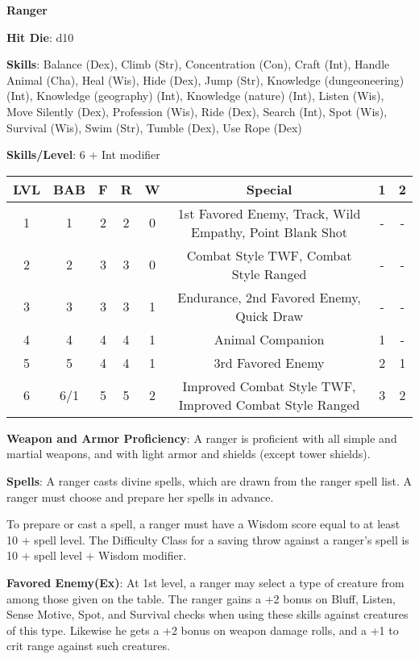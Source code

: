 \textbf{\huge{Ranger}}

\textbf{Hit Die}: d10

\textbf{Skills}: Balance (Dex), Climb (Str), Concentration (Con), Craft (Int), Handle Animal (Cha), Heal (Wis), Hide (Dex), Jump (Str), Knowledge (dungeoneering) (Int), Knowledge (geography) (Int), Knowledge (nature) (Int), Listen (Wis), Move Silently (Dex), Profession (Wis), Ride (Dex), Search (Int), Spot (Wis), Survival (Wis), Swim (Str), Tumble (Dex), Use Rope (Dex)

\textbf{Skills/Level}: 6 + Int modifier

\begin{center}
\begin{adjustwidth}{-4cm}{}
\begin{small}
\begin{tabular}{| c | c | c | c | c | c | c | c |}
\hline
LVL &BAB &F &R &W &Special &1 &2 \\
\hline
1 &1 &2 &2 &0 &1st Favored Enemy, Track, Wild Empathy, Point Blank Shot &- &- \\
2 &2 &3 &3 &0 &Combat Style TWF, Combat Style Ranged &- &- \\
3 &3 &3 &3 &1 &Endurance, 2nd Favored Enemy, Quick Draw &- &- \\
4 &4 &4 &4 &1 &Animal Companion &1 &- \\
5 &5 &4 &4 &1 &3rd Favored Enemy &2 &1 \\
6 &6/1 &5 &5 &2 &Improved Combat Style TWF, Improved Combat Style Ranged &3 &2 \\
\hline
\end{tabular}
\end{small}
\end{adjustwidth}
\end{center}

\textbf{Weapon and Armor Proficiency}: A ranger is proficient with all simple and martial weapons, and with light armor and shields (except tower shields).

\textbf{Spells}: A ranger casts divine spells, which are drawn from the ranger spell list. A ranger must choose and prepare her spells in advance. 

To prepare or cast a spell, a ranger must have a Wisdom score equal to at least 10 + spell level. The Difficulty Class for a saving throw against a ranger's spell is 10 + spell level + Wisdom modifier. 

\textbf{Favored Enemy(Ex)}: At 1st level, a ranger may select a type of creature from among those given on the table. The ranger gains a +2 bonus on Bluff, Listen, Sense Motive, Spot, and Survival checks when using these skills against creatures of this type. Likewise he gets a +2 bonus on weapon damage rolls, and a +1 to crit range against such creatures.

